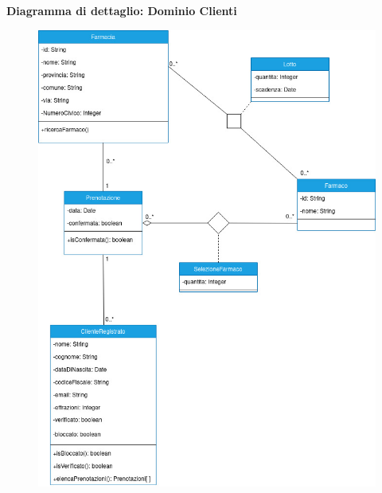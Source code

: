 \vspace{2em}

\textbf{Diagramma di dettaglio: Dominio Clienti}

\begin{figure}[h!]
    \begin{center}
        \includegraphics[scale=0.53]{immagini/DominioCliente-progettazione.jpg}
    \end{center}
\end{figure}

\newpage

